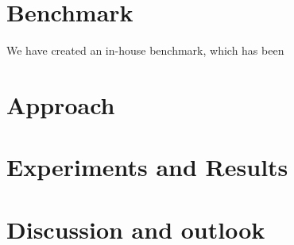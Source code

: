 \documentclass[10pt,a4paper]{article}
\begin{document}
\section{Benchmark}
We have created an in-house benchmark, which has been 

\section{Approach}

\section{Experiments and Results}


\section{Discussion and outlook}
\end{document}
